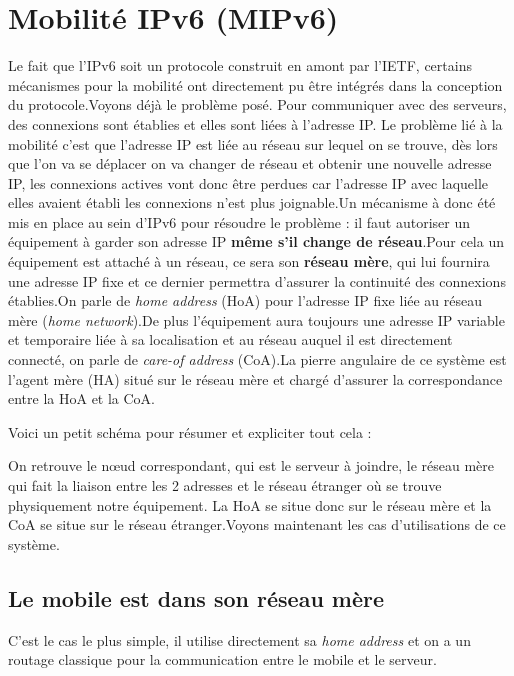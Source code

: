 \section{Mobilité IPv6 (MIPv6)}

Le fait que l’IPv6 soit un protocole construit en amont par l’IETF, certains mécanismes pour la mobilité ont directement pu être intégrés dans la conception du protocole.Voyons déjà le problème posé. Pour communiquer avec des serveurs, des connexions sont établies et elles sont liées à l’adresse IP. Le problème lié à la mobilité c’est que l’adresse IP est liée au réseau sur lequel on se trouve, dès lors que l’on va se déplacer on va changer de réseau et obtenir une nouvelle adresse IP, les connexions actives vont donc être perdues car l’adresse IP avec laquelle elles avaient établi les connexions n’est plus joignable.Un mécanisme à donc été mis en place au sein d’IPv6 pour résoudre le problème : il faut autoriser un équipement à garder son adresse IP \textbf{même s’il change de réseau}.Pour cela un équipement est attaché à un réseau, ce sera son \textbf{réseau mère}, qui lui fournira une adresse IP fixe et ce dernier permettra d’assurer la continuité des connexions établies.On parle de \emph{home address} (HoA) pour l’adresse IP fixe liée au réseau mère (\emph{home network}).De plus l’équipement aura toujours une adresse IP variable et temporaire liée à sa localisation et au réseau auquel il est directement connecté, on parle de \emph{care-of address} (CoA).La pierre angulaire de ce système est l’agent mère (HA) situé sur le réseau mère et chargé d’assurer la correspondance entre la HoA et la CoA.

Voici un petit schéma pour résumer et expliciter tout cela :


On retrouve le nœud correspondant, qui est le serveur à joindre, le réseau mère qui fait la liaison entre les 2 adresses et le réseau étranger où se trouve physiquement notre équipement. La HoA se situe donc sur le réseau mère et la CoA se situe sur le réseau étranger.Voyons maintenant les cas d’utilisations de ce système.

\subsection{Le mobile est dans son réseau mère}

C’est le cas le plus simple, il utilise directement sa \emph{home address} et on a un routage classique pour la communication entre le mobile et le serveur.

